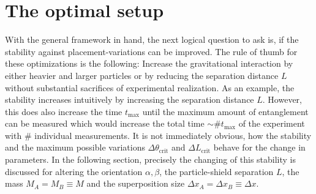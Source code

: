 \newpage
\section{The optimal setup}\label{sec:4:optimal-setup}
With the general framework in hand, the next logical question to ask is, if the stability against placement-variations can be improved.
The rule of thumb for these optimizations is the following:
Increase the gravitational interaction by either heavier and larger particles or by reducing the separation distance $L$ without substantial sacrifices of experimental realization.
As an example, the stability increases intuitively by increasing the separation distance $L$. However, this does also increase the time $t_\mathrm{max}$ until the maximum amount of entanglement can be measured which would increase the total time  $\sim \# t_\mathrm{max}$ of the experiment with $\#$ individual measurements.
It is not immediately obvious, how the stability and the maximum possible variations $\Delta \theta_\mathrm{crit}$ and $\Delta L_\mathrm{crit}$ behave for the change in parameters.
In the following section, precisely the changing of this stability is discussed for altering the orientation $\alpha, \beta$, the particle-shield separation $L$, the mass $M_A = M_B \equiv M$ and the superposition size $\Delta x_A = \Delta x_B \equiv \Delta x$.

